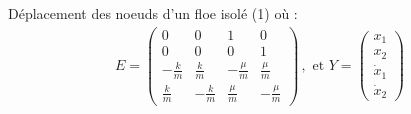 \begin{frame}{Déplacement des noeuds d’un floe isolé (1)}
{{            où :
            \begin{align*}
                E = \begin{pmatrix}
                    0 & 0 & 1 & 0 \\ 0 & 0& 0& 1 \\ -\frac{k}{m} & \frac{k}{m} & -\frac{\mu}{m} & \frac{\mu}{m} \\ \frac{k}{m} & -\frac{k}{m} & \frac{\mu}{m} & -\frac{\mu}{m}
                \end{pmatrix} \,,
                \text{ et } Y = \begin{pmatrix} x_1 \\ x_2 \\ \dot{x}_1 \\ \dot{x}_2 \end{pmatrix} 
            \end{align*}
        }
    }
    
\end{frame}


